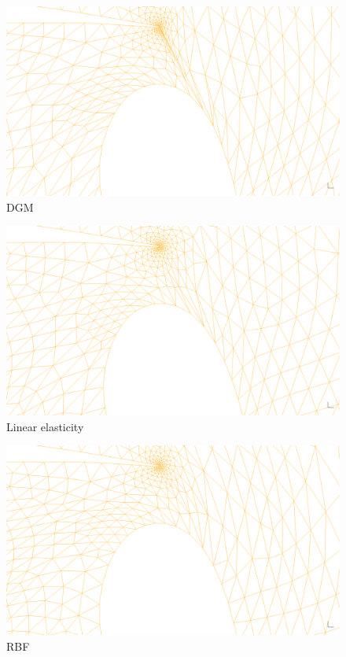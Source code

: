 \documentclass{article}
\begin{document}
\begin{figure}
\includegraphics[scale=0.18]{movedwing-dgm--60}
\caption{DGM}
\end{figure}

\begin{figure}
\includegraphics[scale=0.18]{movedwing-elast--60}
\caption{Linear elasticity}
\end{figure}

\begin{figure}
\includegraphics[scale=0.18]{movedwing-rbf--60}
\caption{RBF}
\end{figure}
 
\end{document}

